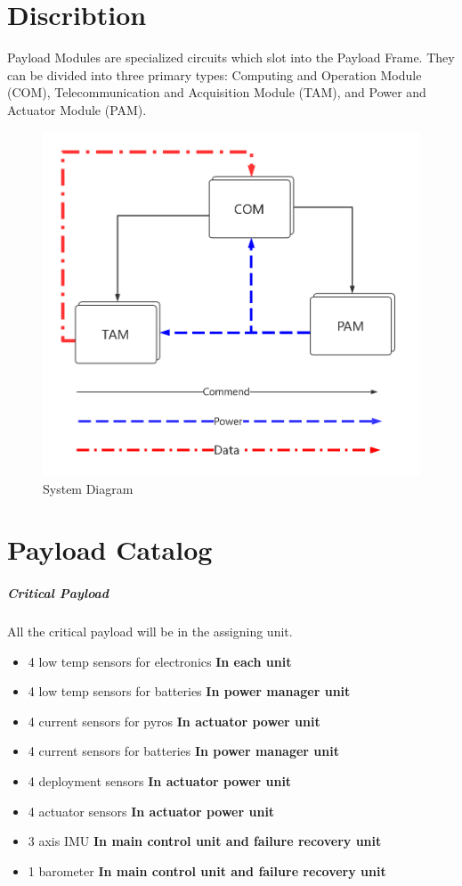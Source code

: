 \documentclass[12pt,article]{memoir}
\begin{document}
\section{Discribtion}
Payload Modules are specialized circuits which slot into the Payload Frame. They can be divided into three primary types: Computing and Operation Module (COM), Telecommunication and Acquisition Module (TAM), and Power and Actuator Module (PAM).
\begin{figure}[htp]
\includegraphics[width=\textwidth]{img/ES00003_Globaldia.png}
 \caption{System Diagram}	
\end{figure}
\clearpage
\section{Payload Catalog}

\subparagraph{Critical Payload}
All the critical payload will be in the assigning unit.
\begin{itemize}
\item 4 low temp sensors for electronics \textbf{In each unit}
\item 4 low temp sensors for batteries \textbf{In power manager unit}
\item 4 current sensors for pyros \textbf{In actuator power unit}
\item 4 current sensors for batteries \textbf{In power manager unit}
\item 4 deployment sensors \textbf{In actuator power unit}
\item 4 actuator sensors \textbf{In actuator power unit}
\item 3 axis IMU \textbf{In main control unit and failure recovery unit}
\item 1 barometer  \textbf{In main control unit and failure recovery unit}
\end{itemize}
\end{document}
